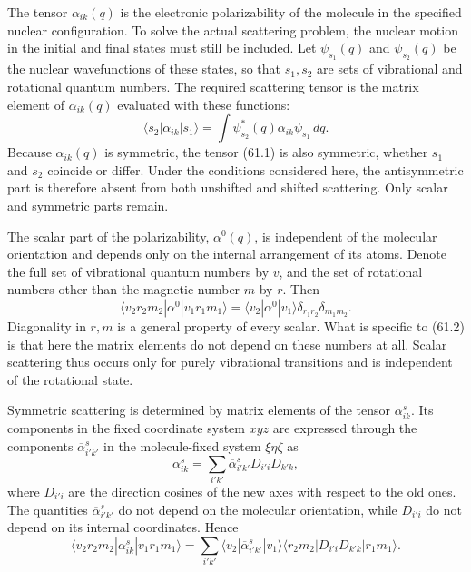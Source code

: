 The tensor $\alpha_{ik}(q)$ is the electronic polarizability of the molecule in the specified nuclear configuration. To solve the actual scattering problem, the nuclear motion in the initial and final states must still be included. Let $\psi_{s_1}(q)$ and $\psi_{s_2}(q)$ be the nuclear wavefunctions of these states, so that $s_1,s_2$ are sets of vibrational and rotational quantum numbers. The required scattering tensor is the matrix element of $\alpha_{ik}(q)$ evaluated with these functions:
\begin{equation}
\langle s_2|\alpha_{ik}|s_1\rangle
=\int\psi_{s_2}^*(q)\alpha_{ik}\psi_{s_1}\,dq.
\tag{61.1}
\end{equation}
Because $\alpha_{ik}(q)$ is symmetric, the tensor (61.1) is also symmetric, whether $s_1$ and $s_2$ coincide or differ. Under the conditions considered here, the antisymmetric part is therefore absent from both unshifted and shifted scattering. Only scalar and symmetric parts remain.

The scalar part of the polarizability, $\alpha^0(q)$, is independent of the molecular orientation and depends only on the internal arrangement of its atoms. Denote the full set of vibrational quantum numbers by $v$, and the set of rotational numbers other than the magnetic number $m$ by $r$. Then
\begin{equation}
\langle v_2r_2m_2|\alpha^0|v_1r_1m_1\rangle
=\langle v_2|\alpha^0|v_1\rangle
\delta_{r_1r_2}\delta_{m_1m_2}.
\tag{61.2}
\end{equation}
Diagonality in $r,m$ is a general property of every scalar. What is specific to (61.2) is that here the matrix elements do not depend on these numbers at all. Scalar scattering thus occurs only for purely vibrational transitions and is independent of the rotational state.

Symmetric scattering is determined by matrix elements of the tensor $\alpha^s_{ik}$. Its components in the fixed coordinate system $xyz$ are expressed through the components $\overline\alpha^s_{i'k'}$ in the molecule-fixed system $\xi\eta\zeta$ as
\begin{equation}
\alpha^s_{ik}=\sum_{i'k'}\overline\alpha^s_{i'k'}D_{i'i}D_{k'k},
\tag{61.3}
\end{equation}
where $D_{i'i}$ are the direction cosines of the new axes with respect to the old ones. The quantities $\overline\alpha^s_{i'k'}$ do not depend on the molecular orientation, while $D_{i'i}$ do not depend on its internal coordinates. Hence
\[
\langle v_2r_2m_2|\alpha^s_{ik}|v_1r_1m_1\rangle
=\sum_{i'k'}\langle v_2|\overline\alpha^s_{i'k'}|v_1\rangle
\langle r_2m_2|D_{i'i}D_{k'k}|r_1m_1\rangle.
\]

